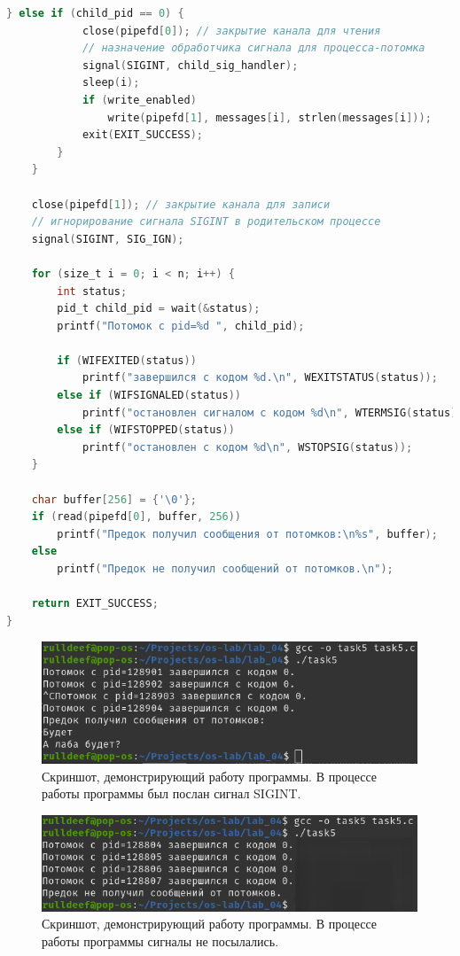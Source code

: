 \begin{lstlisting}[language=C,firstnumber=34,caption=Исходный код для задания 5 (Часть 2).]			
		} else if (child_pid == 0) {
			close(pipefd[0]); // закрытие канала для чтения
			// назначение обработчика сигнала для процесса-потомка
			signal(SIGINT, child_sig_handler);
			sleep(i);
			if (write_enabled)
				write(pipefd[1], messages[i], strlen(messages[i]));
			exit(EXIT_SUCCESS);
		}
	}
	
	close(pipefd[1]); // закрытие канала для записи
	// игнорирование сигнала SIGINT в родительском процессе
	signal(SIGINT, SIG_IGN);
	
	for (size_t i = 0; i < n; i++) {
		int status;
		pid_t child_pid = wait(&status);
		printf("Потомок с pid=%d ", child_pid);
		
		if (WIFEXITED(status))
			printf("завершился с кодом %d.\n", WEXITSTATUS(status));
		else if (WIFSIGNALED(status))
			printf("остановлен сигналом с кодом %d\n", WTERMSIG(status));
		else if (WIFSTOPPED(status))
			printf("остановлен с кодом %d\n", WSTOPSIG(status));
	}
	
	char buffer[256] = {'\0'};
	if (read(pipefd[0], buffer, 256))
		printf("Предок получил сообщения от потомков:\n%s", buffer);
	else
		printf("Предок не получил сообщений от потомков.\n");
	
	return EXIT_SUCCESS;
}
\end{lstlisting}

\begin{figure}[ht]
	\centering
	\includegraphics[width=\linewidth]{img/task5.png}
	\caption{Скриншот, демонстрирующий работу программы. В процессе работы программы был послан сигнал SIGINT.}
\end{figure}

\begin{figure}[ht]
	\centering
	\includegraphics[width=\linewidth]{img/task5-2.png}
	\caption{Скриншот, демонстрирующий работу программы. В процессе работы программы сигналы не посылались.}
\end{figure}
